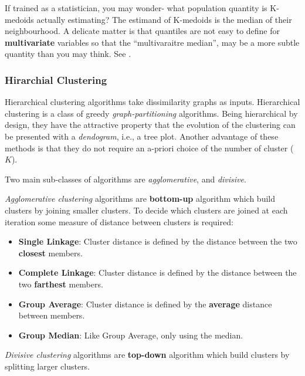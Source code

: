 \documentclass[]{book}
\providecommand{\tightlist}{%
  \setlength{\itemsep}{0pt}\setlength{\parskip}{0pt}}
\theoremstyle{definition}
\theoremstyle{definition}
\theoremstyle{definition}
\theoremstyle{remark}
\let\BeginKnitrBlock\begin \let\EndKnitrBlock\end
\begin{document}
\bigskip

\BeginKnitrBlock{remark}
{}If trained as a statistician, you may wonder- what population quantity is K-medoids actually estimating?
The estimand of K-medoids is the median of their neighbourhood.
A delicate matter is that quantiles are not easy to define for \textbf{multivariate} variables so that the ``multivaraitre median'', may be a more subtle quantity than you may think.
See \citet{small1990survey}.
\EndKnitrBlock{remark}

\hypertarget{hirarchial-clustering}{%
\subsubsection{Hirarchial Clustering}\label{hirarchial-clustering}}

Hierarchical clustering algorithms take dissimilarity graphs as inputs.
Hierarchical clustering is a class of greedy \emph{graph-partitioning} algorithms.
Being hierarchical by design, they have the attractive property that the evolution of the clustering can be presented with a \emph{dendogram}, i.e., a tree plot. Another advantage of these methods is that they do not require an a-priori choice of the number of cluster (\(K\)).

Two main sub-classes of algorithms are \emph{agglomerative}, and \emph{divisive}.

\emph{Agglomerative clustering} algorithms are \textbf{bottom-up} algorithm which build clusters by joining smaller clusters.
To decide which clusters are joined at each iteration some measure of distance between clusters is required:

\begin{itemize}
\tightlist
\item
  \textbf{Single Linkage}:
  Cluster distance is defined by the distance between the two \textbf{closest} members.
\item
  \textbf{Complete Linkage}:
  Cluster distance is defined by the distance between the two \textbf{farthest} members.
\item
  \textbf{Group Average}:
  Cluster distance is defined by the \textbf{average} distance between members.
\item
  \textbf{Group Median}:
  Like Group Average, only using the median.
\end{itemize}

\emph{Divisive clustering} algorithms are \textbf{top-down} algorithm which build clusters by splitting larger clusters.
\end{document}
